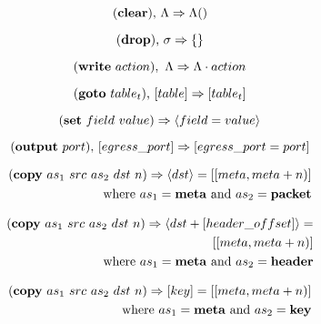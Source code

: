 \documentclass{article}
\begin{document}
\begin{equation}
  (\textrm{\textbf{clear}}) \textrm{,} \ \Lambda \Rightarrow \Lambda()
\end{equation}

\begin{equation}
  (\textrm{\textbf{drop})} \textrm{,} \ \sigma \Rightarrow \{ \}
\end{equation}

\begin{equation}
  (\textrm{\textbf{write}} \ action), \ \Lambda \Rightarrow \Lambda \cdot action
\end{equation}

\begin{equation}
  (\textrm{\textbf{goto}} \ table_t) \textrm{,} \ [table] \Rightarrow
  [table_t]
\end{equation}

\begin{equation}
  (\textrm{\textbf{set}} \ field \ value) \Rightarrow \langle field = value \rangle
\end{equation}

\begin{equation}
  (\textrm{\textbf{output}} \ port) \textrm{,} \ [egress\_port] \Rightarrow
  [egress\_port = port]
\end{equation}

\begin{equation}
\begin{split}
  (\textrm{\textbf{copy}} \ as_1 \ src \ as_2 \ dst \ n) \Rightarrow \langle
  dst \rangle = [[meta, meta + n)] \\ 
    \textrm{where} \ as_1 = \textrm{\textbf{meta} and } as_2 =
    \textrm{\textbf{packet}}
\end{split}
\end{equation}

\begin{equation}
\begin{split}
  (\textrm{\textbf{copy}} \ as_1 \ src \ as_2 \ dst \ n) \Rightarrow \langle
  dst + [header\_offset] \rangle = \\
  [[meta, meta + n)] \\ 
    \textrm{where} \ as_1 = \textrm{\textbf{meta} and } as_2 =
    \textrm{\textbf{header}}
\end{split}
\end{equation}

\begin{equation}
\begin{split}
  (\textrm{\textbf{copy}} \ as_1 \ src \ as_2 \ dst \ n) \Rightarrow [key] =
  [[meta, meta + n)] \\ 
    \textrm{where} \ as_1 = \textrm{\textbf{meta} and } as_2 =
    \textrm{\textbf{key}}
\end{split}
\end{equation}
\end{document}
